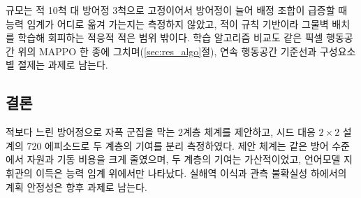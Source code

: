 규모는 적 10척 대 방어정 3척으로 고정이어서 방어정이 늘어 배정 조합이 급증할 때 능력 임계가
어디로 옮겨 가는지는 측정하지 않았고, 적이 규칙 기반이라 그물벽 배치를 학습해 회피하는 적응적
적은 범위 밖이다. 학습 알고리즘 비교도 같은 픽셀 행동공간 위의 MAPPO 한
종에 그치며(\ref{sec:res_algo}절), 연속 행동공간 기준선과 구성요소별 절제는 과제로 남는다.

\subsection{결론}
\label{sec:conclusion}

적보다 느린 방어정으로 자폭 군집을 막는 2계층 체계를 제안하고, 시드 대응 $2\times2$ 설계의
720 에피소드로 두 계층의 기여를 분리 측정하였다. 제안 체계는 같은 방어 수준에서 자원과 기동
비용을 크게 줄였으며, 두 계층의 기여는 가산적이었고, 언어모델 지휘관의 이득은 능력 임계 위에서만
나타났다. 실해역 이식과 관측 불확실성 하에서의 계획 안정성은 향후 과제로 남는다.
